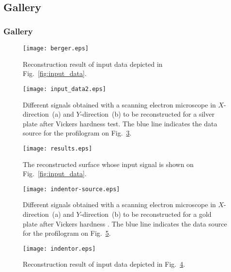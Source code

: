 \documentclass{beamer}
\begin{document}
\subsection{Gallery}
\begin{frame}[c,allowframebreaks]
    \frametitle{Gallery}

    \begin{figure}
        \texttt{[image: berger.eps]}
        \caption{Reconstruction result of input data depicted in Fig.~\ref{fig:input_data}.}
        {\label{fig:berger}}%
    \end{figure}

\framebreak

    \begin{figure}
        \texttt{[image: input\_data2.eps]}
        \caption{Different signals obtained with a scanning electron microscope in $X$-direction~(a)
        and $Y$-direction~(b) to be reconstructed for a silver plate after Vickers hardness test.
        The blue line indicates the data source for the profilogram on Fig.~\ref{fig:results}.}
    {\label{fig:input_data2}}%
    \end{figure}

\framebreak
    \begin{figure}[t]
        \texttt{[image: results.eps]}
        \caption{The reconstructed surface whose input signal is shown on  Fig.~\ref{fig:input_data}.}
        {\label{fig:results}}
    \end{figure}

\framebreak

    \begin{figure}
        \texttt{[image: indentor-source.eps]}
        \caption{Different signals obtained with a scanning electron microscope in $X$-direction~(a) and $Y$-direction~(b) to be reconstructed for a gold plate after Vickers hardness . The blue line indicates the data source for the profilogram on Fig.~\ref{fig:indentor}.}
        {\label{fig:indentor-source}}%
    \end{figure}

\framebreak

    \begin{figure}
        \texttt{[image: indentor.eps]}
        \caption{Reconstruction result of input data depicted in Fig.~\ref{fig:indentor-source}.}
        {\label{fig:indentor}}%
    \end{figure}

\end{frame}
\end{document}
